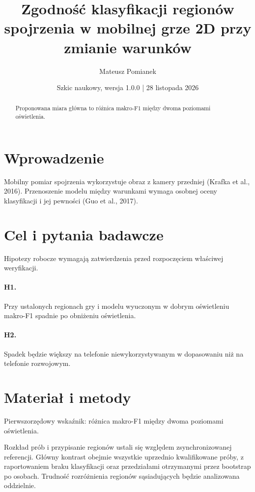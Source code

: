 \documentclass[11pt,a4paper]{article}
\title{Zgodność klasyfikacji regionów spojrzenia w mobilnej grze 2D przy zmianie warunków}
\author{Mateusz Pomianek}
\date{Szkic naukowy, wersja 1.0.0 | 28 listopada 2026}
\begin{document}
\maketitle

\begin{abstract}

Proponowana miara główna to różnica makro-F1 między dwoma poziomami oświetlenia.

\end{abstract}

\section{Wprowadzenie}

Mobilny pomiar spojrzenia wykorzystuje obraz z kamery przedniej (Krafka et al., 2016). Przenoszenie modelu między warunkami wymaga osobnej oceny klasyfikacji i jej pewności (Guo et al., 2017).

\section{Cel i pytania badawcze}

Hipotezy robocze wymagają zatwierdzenia przed rozpoczęciem właściwej weryfikacji.

\paragraph{H1.} Przy ustalonych regionach gry i modelu wyuczonym w dobrym oświetleniu makro-F1 spadnie po obniżeniu oświetlenia.

\paragraph{H2.} Spadek będzie większy na telefonie niewykorzystywanym w dopasowaniu niż na telefonie rozwojowym.

\section{Materiał i metody}

Pierwszorzędowy wskaźnik: różnica makro-F1 między dwoma poziomami oświetlenia.

Rozkład prób i przypisanie regionów ustali się względem zsynchronizowanej referencji. Główny kontrast obejmie wszystkie uprzednio kwalifikowane próby, z raportowaniem braku klasyfikacji oraz przedziałami otrzymanymi przez bootstrap po osobach. Trudność rozróżnienia regionów sąsiadujących będzie analizowana oddzielnie.
\end{document}

